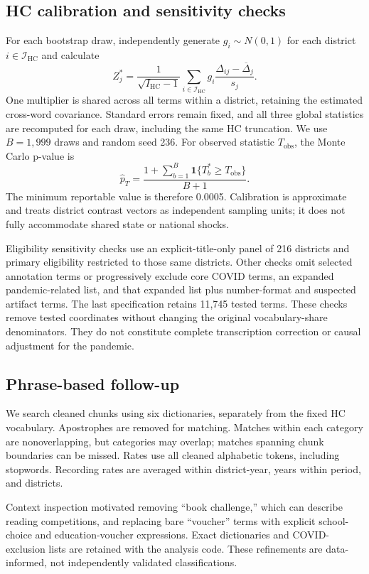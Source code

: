 \subsection{HC calibration and sensitivity checks}
\label{app:hc-calibration}

For each bootstrap draw, independently generate
$g_i\sim N(0,1)$ for each district
$i\in\mathcal I_{\mathrm{HC}}$ and calculate
\[
Z_j^{*}
=
\frac{1}{\sqrt{I_{\mathrm{HC}}-1}}
\sum_{i\in\mathcal I_{\mathrm{HC}}}
g_i
\frac{\Delta_{ij}-\overline{\Delta}_j}{s_j}.
\]
One multiplier is shared across all terms within a district,
retaining the estimated cross-word covariance. Standard
errors remain fixed, and all three global statistics are
recomputed for each draw, including the same HC truncation.
We use $B=1{,}999$ draws and random seed 236. For observed
statistic $T_{\mathrm{obs}}$, the Monte Carlo p-value is
\[
\widehat p_T
=
\frac{
1+\sum_{b=1}^{B}
\mathbf{1}\{T_b^{*}\geq T_{\mathrm{obs}}\}
}{B+1}.
\]
The minimum reportable value is therefore 0.0005. Calibration
is approximate and treats district contrast vectors as
independent sampling units; it does not fully accommodate
shared state or national shocks.

Eligibility sensitivity checks use an explicit-title-only
panel of 216 districts and primary eligibility restricted
to those same districts. Other checks omit selected
annotation terms or progressively exclude core COVID terms,
an expanded pandemic-related list, and that expanded list
plus number-format and suspected artifact terms.
The last specification retains 11,745 tested terms.
These checks remove tested coordinates without changing
the original vocabulary-share denominators. They do not
constitute complete transcription correction or causal
adjustment for the pandemic.

\subsection{Phrase-based follow-up}

We search cleaned chunks using six dictionaries, separately
from the fixed HC vocabulary. Apostrophes are removed for
matching. Matches within each category are nonoverlapping,
but categories may overlap; matches spanning chunk boundaries
can be missed. Rates use all cleaned alphabetic tokens,
including stopwords. Recording rates are averaged within
district-year, years within period, and districts.

Context inspection motivated removing ``book challenge,''
which can describe reading competitions, and replacing bare
``voucher'' terms with explicit school-choice and
education-voucher expressions. Exact dictionaries and
COVID-exclusion lists are retained with the analysis code.
These refinements are data-informed, not independently
validated classifications.

